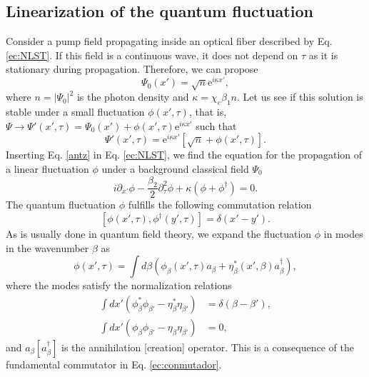 \documentclass[aps,pra,reprint,amsmath,amssymb,showpacs,groupedaddress,floatfix]{revtex4-1}
\begin{document}
\subsection{Linearization of the quantum fluctuation}
Consider a pump field propagating inside an optical fiber described by Eq. \eqref{ec:NLST}. If this field is a continuous wave, it does not depend on $\tau$ as it is stationary during propagation. Therefore, we can propose
\begin{equation}\label{ec:fondo1}
\Psi_0(x')=\sqrt{n}\text{e}^{i\kappa x'},
\end{equation}
where $n=|\Psi_0|^2$ is the photon density and $\kappa=\chi_e \beta_1 n$. Let us see if this solution is stable under a small fluctuation $\phi(x',\tau)$, that is, $\Psi\rightarrow\Psi'(x',\tau)=\Psi_0(x')+\phi(x',\tau)\text{e}^{i\kappa x'}$ such that
\begin{equation}
\Psi'(x',\tau)=\text{e}^{i\kappa x'}\left[\sqrt{n}+\phi(x',\tau)\right].\label{antz}
\end{equation} 
Inserting Eq. \eqref{antz} in Eq. \eqref{ec:NLST}, we find the equation for the propagation of a linear fluctuation $\phi$ under a background classical field $\Psi_0$
\begin{equation}\label{ec:difcampo}
i\partial_{x'}\phi-\frac{\beta_2}{2}\partial_{\tau}^2\phi+\kappa\left(\phi+\phi^{\dagger}\right)=0.
\end{equation}
The quantum fluctuation $\phi$ fulfills the following commutation relation
\begin{equation}
\left[\phi(x',\tau),\phi^{\dagger}(y',\tau)\right]=\delta(x'-y').
\end{equation}
As is usually done in quantum field theory, we expand the fluctuation $\phi$ in modes in the wavenumber $\beta$ as
\begin{equation}\label{expbeta}
\phi(x',\tau)=\int d\beta\left(\phi_{\beta}(x',\tau) a_{\beta}+\eta_{\beta}^*(x',\beta) a_{\beta}^{\dagger}\right),
\end{equation}
where the modes satisfy the normalization relations
\begin{align}
\int dx'\left(\phi_{\beta}^*\phi_{\beta'}-\eta^*_{\beta}\eta_{\beta'}\right)&=\delta(\beta-\beta'),\\
\int dx'  \left(\phi_{\beta}\phi_{\beta'}-\eta_{\beta}\eta_{\beta'}\right)&=0,
\end{align}
and $a_{\beta}[a_{\beta}^{\dagger}]$ is the annihilation [creation] operator. This is a consequence of the fundamental commutator in Eq. \eqref{ec:conmutador}.
\end{document}
